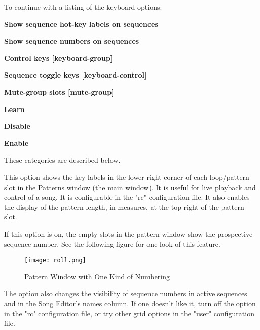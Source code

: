    To continue with a listing of the keyboard options:

   \begin{enumber}
      \item \textbf{Show sequence hot-key labels on sequences}
      \item \textbf{Show sequence numbers on sequences}
      \item \textbf{Control keys [keyboard-group]}
      \item \textbf{Sequence toggle keys [keyboard-control]}
      \item \textbf{Mute-group slots [mute-group]}
      \item \textbf{Learn}
      \item \textbf{Disable}
      \item \textbf{Enable}
   \end{enumber}

   These categories are described below.

   \setcounter{ItemCounter}{0}      %

   This option shows the key labels in the lower-right corner of
   each loop/pattern slot in the Patterns window (the main window).
   It is useful for live playback and control of a song.
   It is configurable in the "rc" configuration file.
   It also enables the display of the pattern length, in
   measures, at the top right of the pattern slot.

   If this option is on, the
   empty slots in the pattern window show the prospective sequence number.
   See the following figure for one look of this feature.

\begin{figure}[H]
   \centering 
   \texttt{[image: roll.png]}
   \caption{Pattern Window with One Kind of Numbering}
   \label{fig:seq66_build_with_numbering}
\end{figure}

   The option also changes the visibility of sequence numbers
   in active sequences and in the Song Editor's names column.
   If one doesn't like it, turn off the option in the "rc" configuration file,
   or try other grid options in the "user" configuration file.

